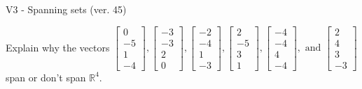\begin{exercise}
  \begin{exerciseTitle}V3 - Spanning sets (ver. 45)\end{exerciseTitle}
  \begin{exerciseStatement}
    Explain why the vectors \(\left[\begin{array}{r}
0 \\
-5 \\
1 \\
-4
\end{array}\right] , \left[\begin{array}{r}
-3 \\
-3 \\
2 \\
0
\end{array}\right] , \left[\begin{array}{r}
-2 \\
-4 \\
1 \\
-3
\end{array}\right] , \left[\begin{array}{r}
2 \\
-5 \\
3 \\
1
\end{array}\right] , \left[\begin{array}{r}
-4 \\
-4 \\
4 \\
-4
\end{array}\right] , \text{ and } \left[\begin{array}{r}
2 \\
4 \\
3 \\
-3
\end{array}\right]\) span or don't span \(\mathbb{R}^4\). 
	



\end{exerciseStatement}
\end{exercise}
